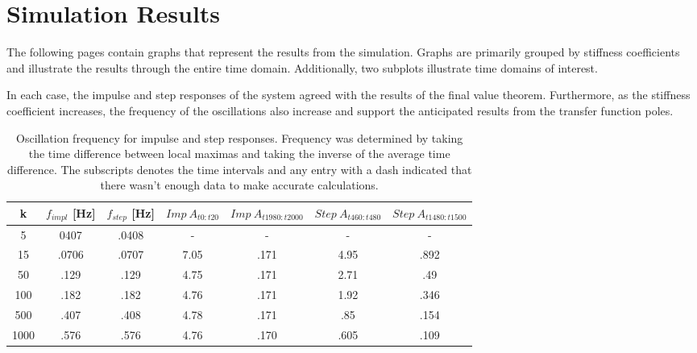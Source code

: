 \documentclass[letterpaper,12pt]{article}
\begin{document}
\section{Simulation Results}
The following pages contain graphs that represent the results from the simulation. Graphs are primarily grouped by stiffness coefficients and illustrate the results through the entire time domain. Additionally, two subplots illustrate time domains of interest.

In each case, the impulse and step responses of the system agreed with the results of the final value theorem. Furthermore, as the stiffness coefficient increases, the frequency of the oscillations also increase and support the anticipated results from the transfer function poles.

\begin{table}[h]
    \centering
    \begin{tabular}{c|c|c|c|c|c|c}
         k & $f_{impl}$ [Hz] & $f_{step}$ [Hz] & $Imp\ A_{t0 : t20}$ & $Imp\ A_{t1980 : t2000}$ & $Step\ A_{t460 : t480}$ & $Step\ A_{t1480 : t1500}$ \\
         \hline
         5 & 0407 & .0408 & - & - & - & - \\
         15 & .0706 & .0707 & 7.05 & .171 & 4.95 & .892\\
         50 & .129 & .129 & 4.75 & .171 & 2.71 & .49 \\
         100 & .182 & .182 & 4.76 & .171 & 1.92 & .346\\
         500 & .407 & .408 & 4.78 & .171 & .85 & .154\\
         1000 & .576 & .576 & 4.76 & .170 & .605 & .109
    \end{tabular}
    \caption{Oscillation frequency for impulse and step responses. Frequency was determined by taking the time difference between local maximas and taking the inverse of the average time difference. The subscripts denotes the time intervals and any entry with a dash indicated that there wasn't enough data to make accurate calculations. }
\end{table}
\end{document}
